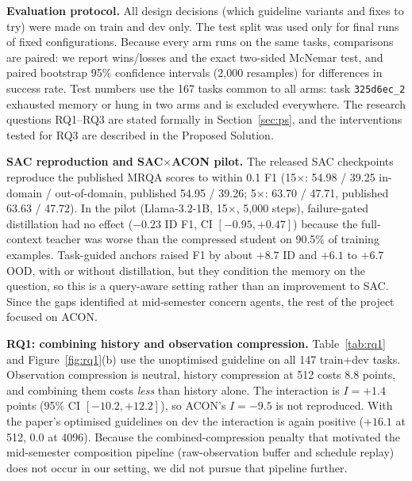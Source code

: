 \documentclass[10pt,a4paper]{article}
\begin{document}
\textbf{Evaluation protocol.} All design decisions (which guideline variants
and fixes to try) were made on train and dev only. The test split was used
only for final runs of fixed configurations. Because every arm runs on the
same tasks, comparisons are paired: we report wins/losses and the exact
two-sided McNemar test, and paired bootstrap 95\% confidence intervals
(2,000 resamples) for differences in success rate. Test numbers use the 167
tasks common to all arms: task \texttt{325d6ec\_2} exhausted memory or hung in
two arms and is excluded everywhere. The research questions RQ1--RQ3 are
stated formally in Section~\ref{sec:ps}, and the interventions tested for RQ3
are described in the Proposed Solution.

\textbf{SAC reproduction and SAC$\times$ACON pilot.} The released SAC checkpoints reproduce the published MRQA scores to within
0.1 F1 (15$\times$: 54.98 / 39.25 in-domain / out-of-domain, published
54.95 / 39.26; 5$\times$: 63.70 / 47.71, published 63.63 / 47.72). In the
pilot (Llama-3.2-1B, 15$\times$, 5,000 steps), failure-gated distillation had
no effect ($-0.23$ ID F1, CI $[-0.95,+0.47]$) because the full-context teacher
was worse than the compressed student on 90.5\% of training examples.
Task-guided anchors raised F1 by about $+8.7$ ID and $+6.1$ to $+6.7$ OOD,
with or without distillation, but they condition the memory on the question, so this is a
query-aware setting rather than an improvement to SAC. Since the gaps
identified at mid-semester concern agents, the rest of the project focused on
ACON.

\textbf{RQ1: combining history and observation compression.} Table~\ref{tab:rq1} and Figure~\ref{fig:rq1}(b) use the unoptimised guideline on
all 147 train+dev tasks.
Observation compression is neutral, history compression at 512 costs 8.8
points, and combining them costs \emph{less} than history alone. The
interaction is $I=+1.4$ points (95\% CI $[-10.2,+12.2]$), so ACON's
$I=-9.5$ is not reproduced. With the paper's optimised guidelines on dev the
interaction is again positive ($+16.1$ at 512, $0.0$ at 4096). Because the
combined-compression penalty that motivated the mid-semester composition
pipeline (raw-observation buffer and schedule replay) does not occur in our
setting, we did not pursue that pipeline further.
\end{document}
